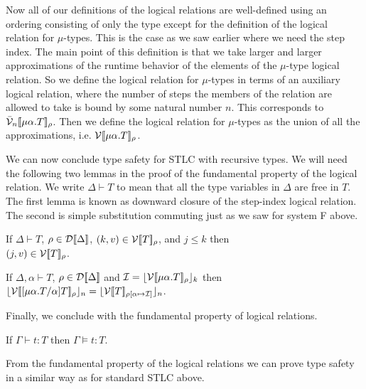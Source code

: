 Now all of our definitions of the logical relations are well-defined
using an ordering consisting of only the type except for the
definition of the logical relation for $\mu$-types.  This is the case
as we saw earlier where we need the step index.  The main point of
this definition is that we take larger and larger approximations of
the runtime behavior of the elements of the $\mu$-type logical
relation.  So we define the logical relation for $\mu$-types in terms
of an auxiliary logical relation, where the number of steps the members
of the relation are allowed to take is bound by some natural number
$n$.  This corresponds to $\bar{\mathcal{V}}_{n}[\negthinspace[\mu \alpha.T]\negthinspace]_\rho$.  Then
we define the logical relation for $\mu$-types as the union of all the
approximations, i.e. $\mathcal{V}[\negthinspace[\mu \alpha.T]\negthinspace]_\rho$.  

We can now conclude type safety for STLC with recursive types.  We
will need the following two lemmas in the proof of the fundamental
property of the logical relation.  We write $\Delta \vdash T$ to mean
that all the type variables in $\Delta$ are free in $T$.  The first
lemma is known as downward closure of the step-index logical relation.
The second is simple substitution commuting just as we saw for system
F above.
\begin{lemma}
  \label{lemma:1}
  If $\Delta \vdash T$, $\rho \in \mathcal{D}[\negthinspace[\Delta]\negthinspace]$, $(k,v) \in \mathcal{V}[\negthinspace[T]\negthinspace]_\rho$, and
  $j \leq k$ then \\ $(j,v) \in \mathcal{V}[\negthinspace[T]\negthinspace]_\rho$.
\end{lemma}

\begin{lemma}
  \label{lemma:2}
  If $\Delta, \alpha \vdash T$, $\rho \in \mathcal{D}[\negthinspace[\Delta]\negthinspace]$ and 
  $\mathcal{I} = \lfloor \mathcal{V}[\negthinspace[\mu \alpha . T]\negthinspace]_\rho \rfloor_{k}$ then \\
  $\lfloor \mathcal{V}[\negthinspace[[\mu \alpha.T/\alpha]T]\negthinspace]_\rho \rfloor_{n} = 
   \lfloor \mathcal{V}[\negthinspace[T]\negthinspace]_{\rho[\alpha \mapsto \mathcal{I}]} \rfloor_{n}$.
\end{lemma}

\noindent
Finally, we conclude with the fundamental property of logical
relations.
\begin{thm}
  \label{thm:fundamental_property}
  If $\Gamma \vdash t : T$ then $\Gamma \models t:T$.
\end{thm}
\noindent
From the fundamental property of the logical relations we can prove
type safety in a similar way as for standard STLC above.  %
